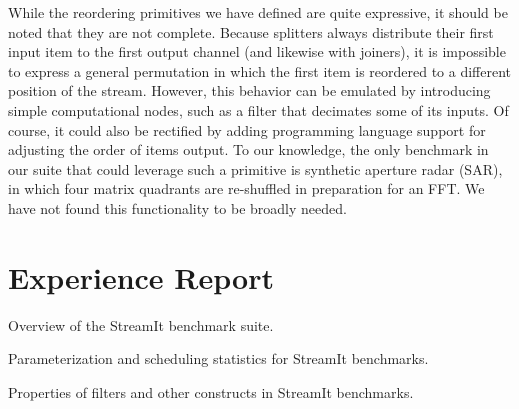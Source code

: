 While the reordering primitives we have defined are quite expressive,
it should be noted that they are not complete.  Because splitters
always distribute their first input item to the first output channel
(and likewise with joiners), it is impossible to express a general
permutation in which the first item is reordered to a different
position of the stream.  However, this behavior can be emulated by
introducing simple computational nodes, such as a filter that
decimates some of its inputs.  Of course, it could also be rectified
by adding programming language support for adjusting the order of
items output.  To our knowledge, the only benchmark in our suite that
could leverage such a primitive is synthetic aperture radar (SAR), in
which four matrix quadrants are re-shuffled in preparation for an FFT.
We have not found this functionality to be broadly needed.


\section{Experience Report}
\label{sec:lang-experience}

\begin{table}[t!]
\vspace{-1\baselineskip}
\vspace{-1.5\baselineskip}
\caption{Overview of the StreamIt benchmark suite.\protect\label{tab:lang-benchmarks}}
\vspace{-0.5in}
\end{table}

\begin{table}[t!]
\vspace{-2\baselineskip}
\vspace{-1.5\baselineskip}
\caption{Parameterization and scheduling statistics for StreamIt 
benchmarks.\protect\label{tab:lang-benchmarks-params}}
\vspace{-0.5in}
\end{table}

\begin{table}[t!]
\vspace{-2.5\baselineskip}
\vspace{-1.5\baselineskip}
\caption{Properties of filters and other constructs in StreamIt 
benchmarks.\protect\label{tab:lang-benchmarks-filters}}
\vspace{-0.5in}
\end{table}

